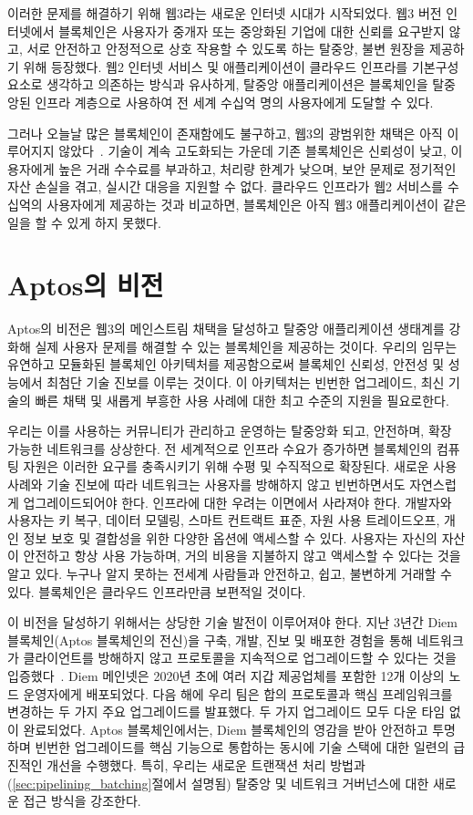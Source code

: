 \documentclass{article}
\begin{document}
이러한 문제를 해결하기 위해 웹3라는 새로운 인터넷 시대가 시작되었다. 웹3 버전 인터넷에서 블록체인은 사용자가 중개자 또는 중앙화된 기업에 대한 신뢰를 요구받지 않고, 서로 안전하고 안정적으로 상호 작용할 수 있도록 하는 탈중앙, 불변 원장을 제공하기 위해 등장했다. 웹2 인터넷 서비스 및 애플리케이션이 클라우드 인프라를 기본구성요소로 생각하고 의존하는 방식과 유사하게, 탈중앙 애플리케이션은 블록체인을 탈중앙된 인프라 계층으로 사용하여 전 세계 수십억 명의 사용자에게 도달할 수 있다.

그러나 오늘날 많은 블록체인이 존재함에도 불구하고, 웹3의 광범위한 채택은 아직 이루어지지 않았다~\cite{a16_state}. 기술이 계속 고도화되는 가운데 기존 블록체인은 신뢰성이 낮고, 이용자에게 높은 거래 수수료를 부과하고, 처리량 한계가 낮으며, 보안 문제로 정기적인 자산 손실을 겪고, 실시간 대응을 지원할 수 없다. 클라우드 인프라가 웹2 서비스를 수십억의 사용자에게 제공하는 것과 비교하면, 블록체인은 아직 웹3 애플리케이션이 같은 일을 할 수 있게 하지 못했다.

\section{Aptos의 비전}
\label{sec:aptos_vision}

Aptos의 비전은 웹3의 메인스트림 채택을 달성하고 탈중앙 애플리케이션 생태계를 강화해 실제 사용자 문제를 해결할 수 있는 블록체인을 제공하는 것이다. 우리의 임무는 유연하고 모듈화된 블록체인 아키텍처를 제공함으로써 블록체인 신뢰성, 안전성 및 성능에서 최첨단 기술 진보를 이루는 것이다. 이 아키텍처는 빈번한 업그레이드, 최신 기술의 빠른 채택 및 새롭게 부흥한 사용 사례에 대한 최고 수준의 지원을 필요로한다.

우리는 이를 사용하는 커뮤니티가 관리하고 운영하는 탈중앙화 되고, 안전하며, 확장 가능한 네트워크를 상상한다. 전 세계적으로 인프라 수요가 증가하면 블록체인의 컴퓨팅 자원은 이러한 요구를 충족시키기 위해 수평 및 수직적으로 확장된다. 새로운 사용 사례와 기술 진보에 따라 네트워크는 사용자를 방해하지 않고 빈번하면서도 자연스럽게 업그레이드되어야 한다. 인프라에 대한 우려는 이면에서 사라져야 한다. 개발자와 사용자는 키 복구, 데이터 모델링, 스마트 컨트랙트 표준, 자원 사용 트레이드오프, 개인 정보 보호 및 결합성을 위한 다양한 옵션에 액세스할 수 있다. 사용자는 자신의 자산이 안전하고 항상 사용 가능하며, 거의 비용을 지불하지 않고 액세스할 수 있다는 것을 알고 있다. 누구나 알지 못하는 전세계 사람들과 안전하고, 쉽고, 불변하게 거래할 수 있다. 블록체인은 클라우드 인프라만큼 보편적일 것이다.

이 비전을 달성하기 위해서는 상당한 기술 발전이 이루어져야 한다. 지난 3년간 Diem 블록체인(Aptos 블록체인의 전신)을 구축, 개발, 진보 및 배포한 경험을 통해 네트워크가 클라이언트를 방해하지 않고 프로토콜을 지속적으로 업그레이드할 수 있다는 것을 입증했다~\cite{diem_blockchain}. Diem 메인넷은 2020년 초에 여러 지갑 제공업체를 포함한 12개 이상의 노드 운영자에게 배포되었다. 다음 해에 우리 팀은 합의 프로토콜과 핵심 프레임워크를 변경하는 두 가지 주요 업그레이드를 발표했다. 두 가지 업그레이드 모두 다운 타임 없이 완료되었다. Aptos 블록체인에서는, Diem 블록체인의 영감을 받아 안전하고 투명하며 빈번한 업그레이드를 핵심 기능으로 통합하는 동시에 기술 스택에 대한 일련의 급진적인 개선을 수행했다. 특히, 우리는 새로운 트랜잭션 처리 방법과 (\ref{sec:pipelining_batching}절에서 설명됨) 탈중앙 및 네트워크 거버넌스에 대한 새로운 접근 방식을 강조한다.
\end{document}
